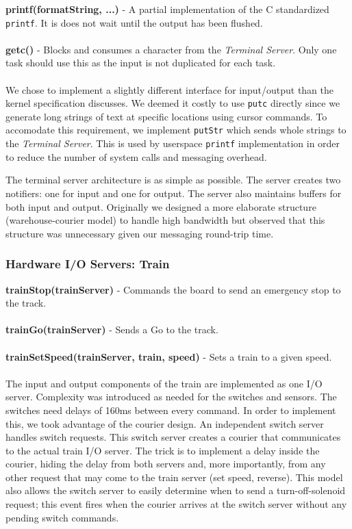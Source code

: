 \documentclass[twoside,a4paper]{refart}
\begin{document}
\textbf{printf(formatString, ...)} - A partial implementation of the C standardized \verb~printf~. It is does not wait until the output has been flushed.\\\\
\textbf{getc()} - Blocks and consumes a character from the \textit{Terminal Server}. Only one task should use this as the input is not duplicated for each task.\\\\

We chose to implement a slightly different interface for input/output than the kernel specification discusses. We deemed it costly to use \verb~putc~ directly since we generate long strings of text at specific locations using cursor commands. To accomodate this requirement, we implement \verb~putStr~ which sends whole strings to the \textit{Terminal Server}. This is used by userspace \verb~printf~ implementation in order to reduce the number of system calls and messaging overhead.

The terminal server architecture is as simple as possible. The server creates two notifiers: one for input and one for output. The server also maintains buffers for both input and output. Originally we designed a more elaborate structure (warehouse-courier model) to handle high bandwidth but observed that this structure was unnecessary given our messaging round-trip time.

\subsubsection{Hardware I/O Servers: Train}

\textbf{trainStop(trainServer)} - Commands the board to send an emergency stop to the track.\\\\
\textbf{trainGo(trainServer)} - Sends a Go to the track.\\\\
\textbf{trainSetSpeed(trainServer, train, speed)} - Sets a train to a given speed.\\\\

The input and output components of the train are implemented as one I/O server. Complexity was introduced as needed for the switches and sensors. The switches need delays of 160ms between every command. In order to implement this, we took advantage of the courier design. An independent switch server handles switch requests. This switch server creates a courier that communicates to the actual train I/O server. The trick is to implement a delay inside the courier, hiding the delay from both servers and, more importantly, from any other request that may come to the train server (set speed, reverse). This model also allows the switch server to easily determine when to send a turn-off-solenoid request; this event fires when the courier arrives at the switch server without any pending switch commands.
\end{document}
